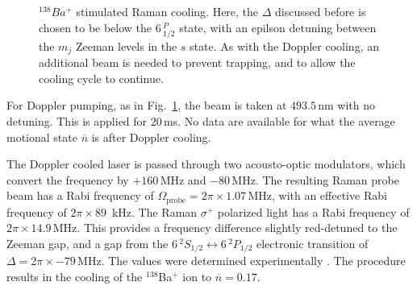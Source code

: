 \documentclass[12pt,a4paper]{amsart}
\numberwithin{equation}{section}
\theoremstyle{plain}
\theoremstyle{definition}
\begin{document}
\begin{figure}
\centering
{}
    \caption{${}^{138}Ba^+$ stimulated Raman cooling. Here, the $\Delta$ discussed before is chosen to be below the $6\,^P_{1/2}$ state, with an epilson detuning between the $m_j$ Zeeman levels in the $s$ state. As with the Doppler cooling, an additional beam is needed to prevent trapping, and to allow the cooling cycle to continue.\cite{rareEartCool}}
    \label{fig:rareEartCool2}
\end{figure}
For Doppler pumping, as in Fig.~\ref{fig:rareEartCool2}, the beam is taken at $493.5\,$nm with no detuning. This is applied for $20\,$ms. No data are available for what the average motional state $\overline{n}$ is after Doppler cooling.


The Doppler cooled laser is passed through two acousto-optic modulators, which convert the frequency by $+160\,$MHz and $-80\,$MHz. The resulting Raman probe beam has a Rabi frequency of $\Omega_{\mathrm{probe}} = 2\pi \times 1.07\,$MHz, with an effective Rabi frequency of $2\pi \times 89\,$ kHz. The Raman $\sigma^+$ polarized light has a Rabi frequency of $2\pi \times 14.9\,$MHz. This provides a frequency difference slightly red-detuned to the Zeeman gap, and a gap from the $6\,^2S_{1/2}\leftrightarrow 6\,^2P_{1/2}$ electronic transition of $\Delta = 2\pi \times -79\,$MHz. The values were determined experimentally \cite{rareEartCool}.
The procedure results in the cooling of the ${}^{138}$Ba$^+$ ion to $\overline{n}=0.17$.
\end{document}

